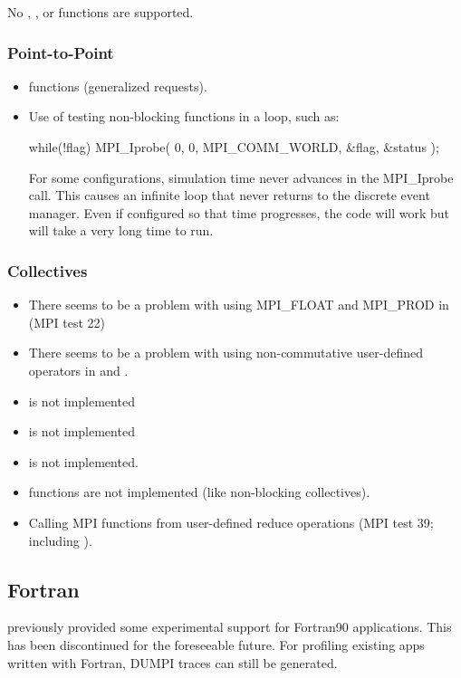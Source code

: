 No , , or  functions are supported.

\subsubsection{Point-to-Point}
\label{subsubsec:issues:mpi:ptpt}

\begin{itemize}
\item {} functions (generalized requests).
\item Use of testing non-blocking functions in a loop, such as:


\begin{CppCode}
while(!flag)
{
  MPI_Iprobe( 0, 0, MPI_COMM_WORLD, &flag, &status );
}
\end{CppCode}

For some configurations, simulation time never advances in the MPI\_Iprobe call. 
This causes an infinite loop that never returns to the discrete event manager. 
Even if configured so that time progresses, the code will work but will take a very long time to run.
	
\end{itemize}


\subsubsection{Collectives}
\label{subsubsec:issues:mpi:collectives}

\begin{itemize}
\item There seems to be a problem with using MPI\_FLOAT and MPI\_PROD in  (MPI test 22)
\item There seems to be a problem with using non-commutative user-defined operators in  and .
\item {} is not implemented
\item {} is not implemented
\item {} is not implemented.
\item {} functions are not implemented  (like non-blocking collectives).
\item Calling MPI functions from user-defined reduce operations (MPI test 39; including ).
\end{itemize}


\subsection{Fortran}
\label{subsec:issues:fortran}

\sstmacro previously provided some experimental support for Fortran90 applications. 
This has been discontinued for the foreseeable future.
For profiling existing apps written with Fortran, DUMPI traces can still be generated. 

